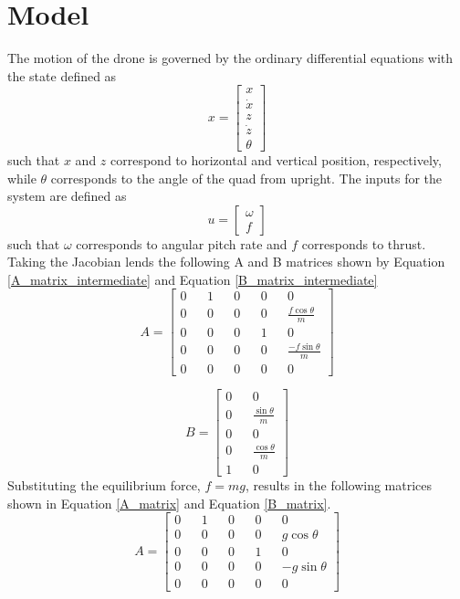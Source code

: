 \documentclass[12pt]{article}
\begin{document}
\section{Model}
The motion of the drone is governed by the ordinary differential equations with the state defined as
\begin{equation}
\label{state}
x = \begin{bmatrix} x\\ \dot{x} \\ z \\ \dot{z} \\ \theta \end{bmatrix}
\end{equation}
such that $x$ and $z$ correspond to horizontal and vertical position, respectively, while $\theta$ corresponds to the angle of the quad from upright. The inputs for the system are defined as
\begin{equation}
\label{inputs}
u = \begin{bmatrix} \omega \\ f \end{bmatrix}
\end{equation}
such that $\omega$ corresponds to angular pitch rate and $f$ corresponds to thrust. Taking the Jacobian lends the following A and B matrices shown by Equation \ref{A_matrix_intermediate} and Equation \ref{B_matrix_intermediate}
\begin{equation}
\label{A_matrix_intermediate}
A = \begin{bmatrix} 0 && 1 && 0 && 0 && 0 \\ 0 && 0 && 0 && 0 && \frac{f\cos{\theta}}{m} \\  0 && 0 && 0 && 1 && 0 \\ 0 && 0 && 0 && 0 && \frac{-f\sin{\theta}}{m} \\ 0 && 0 && 0 && 0 && 0 \end{bmatrix}
\end{equation}

\begin{equation}
\label{B_matrix_intermediate}
B = \begin{bmatrix} 0 && 0 \\ 0 && \frac{\sin{\theta}}{m} \\ 0 && 0 \\ 0 && \frac{\cos{\theta}}{m} \\ 1 && 0 \end{bmatrix}
\end{equation}
Substituting the equilibrium force, $f = mg$, results in the following matrices shown in Equation \ref{A_matrix} and Equation \ref{B_matrix}.
\begin{equation}
\label{A_matrix}
A = \begin{bmatrix} 0 && 1 && 0 && 0 && 0 \\ 0 && 0 && 0 && 0 && g\cos{\theta} \\  0 && 0 && 0 && 1 && 0 \\ 0 && 0 && 0 && 0 && -g\sin{\theta} \\ 0 && 0 && 0 && 0 && 0 \end{bmatrix}
\end{equation}
\end{document}
